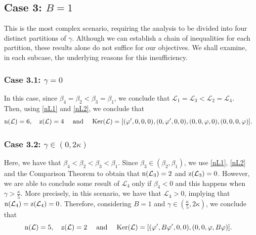 \documentclass[10pt,reqno,a4paper]{amsart} %
\theoremstyle{definition} %
\numberwithin{equation}{section}
\numberwithin{figure}{section}
\begin{document}
\subsection*{Case 3: $B = 1$} This is the most complex scenario, requiring the analysis to be divided into four distinct partitions of $\gamma$. Although we can establish a chain of inequalities for each partition, these results alone do not suffice for our objectives. We shall examine, in each subcase, the underlying reasons for this insufficiency.

\subsubsection*{Case 3.1: $\gamma = 0$} In this case, since $\beta_4 = \beta_2 < \beta_3 = \beta_1$, we conclude that $\mathcal{L}_1 = \mathcal{L}_3 < \mathcal{L}_2 = \mathcal{L}_4$. Then, using \eqref{nL1} and \eqref{nL2}, we conclude that
\begin{equation*}%
    {\rm n}(\mathcal{L}) = 6, \quad {\rm z}(\mathcal{L}) = 4 \quad \text{ and } \quad {\rm Ker}(\mathcal{L}) = [(\varphi',0,0,0), (0,\varphi',0,0), (0,0,\varphi,0), (0,0,0,\varphi)].
\end{equation*}

\subsubsection*{Case 3.2: $\gamma \in (0,2\kappa)$} Here, we have that $\beta_4 < \beta_2 < \beta_3 < \beta_1$. Since $\beta_3 \in (\beta_2, \beta_1)$, we use \eqref{nL1}, \eqref{nL2} and the Comparison Theorem to obtain that ${\rm n}(\mathcal{L}_3) = 2$ and ${\rm z}(\mathcal{L}_3) = 0$. However, we are able to conclude some result of $\mathcal{L}_4$ only if $\beta_4 < 0$ and this happens when $\gamma > \frac{\kappa}{5}$. More precisely, in this scenario, we have that $\mathcal{L}_4 > 0$, implying that ${\rm n}(\mathcal{L}_4) = {\rm z}(\mathcal{L}_4) = 0$. Therefore, considering $B = 1$ and $\gamma \in \left(\frac{\kappa}{5}, 2\kappa\right)$, we conclude that 
\begin{equation*}%
    {\rm n}(\mathcal{L}) = 5, \quad {\rm z}(\mathcal{L}) = 2 \quad \text{ and } \quad {\rm Ker}(\mathcal{L}) = [(\varphi', B\varphi',0,0), (0,0,\varphi,B\varphi)].
\end{equation*}
\end{document}
